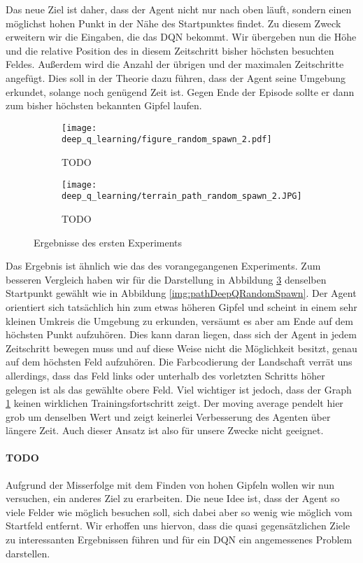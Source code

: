 Das neue Ziel ist daher, dass der Agent nicht nur nach oben läuft, sondern einen möglichst hohen Punkt in der Nähe des Startpunktes findet. Zu diesem Zweck erweitern wir die Eingaben, die das DQN bekommt. Wir übergeben nun die Höhe und die relative Position des in diesem Zeitschritt bisher höchsten besuchten Feldes. Außerdem wird die Anzahl der übrigen und der maximalen Zeitschritte angefügt. Dies soll in der Theorie dazu führen, dass der Agent seine Umgebung erkundet, solange noch genügend Zeit ist. Gegen Ende der Episode sollte er dann zum bisher höchsten bekannten Gipfel laufen.
\begin{figure}[H]
    \centering
    \begin{subfigure}[b]{0.49\textwidth}
        \texttt{[image: deep\_q\_learning/figure\_random\_spawn\_2.pdf]}
        \caption{TODO}
        \label{img:graphDeepQRandomSpawn2}
    \end{subfigure}
    \begin{subfigure}[b]{0.49\textwidth}
        \texttt{[image: deep\_q\_learning/terrain\_path\_random\_spawn\_2.JPG]}
        \caption{TODO}
        \label{img:pathDeepQRandomSpawn2}
    \end{subfigure}
    \caption{Ergebnisse des ersten Experiments}
\end{figure}
Das Ergebnis ist ähnlich wie das des vorangegangenen Experiments. Zum besseren Vergleich haben wir für die Darstellung in Abbildung \ref{img:pathDeepQRandomSpawn2} denselben Startpunkt gewählt wie in Abbildung \ref{img:pathDeepQRandomSpawn}. Der Agent orientiert sich tatsächlich hin zum etwas höheren Gipfel und scheint in einem sehr kleinen Umkreis die Umgebung zu erkunden, versäumt es aber am Ende auf dem höchsten Punkt aufzuhören. Dies kann  daran liegen, dass sich der Agent in jedem Zeitschritt bewegen muss und auf diese Weise nicht die Möglichkeit besitzt, genau auf dem höchsten Feld aufzuhören. Die Farbcodierung der Landschaft verrät uns allerdings, dass das Feld links oder unterhalb des vorletzten Schritts höher gelegen ist als das gewählte obere Feld. Viel wichtiger ist jedoch, dass der Graph \ref{img:graphDeepQRandomSpawn2} keinen wirklichen Trainingsfortschritt zeigt. Der moving average pendelt hier grob um denselben Wert und zeigt keinerlei Verbesserung des Agenten über längere Zeit. Auch dieser Ansatz ist also für unsere Zwecke nicht geeignet.

\paragraph{TODO}
Aufgrund der Misserfolge mit dem Finden von hohen Gipfeln wollen wir nun versuchen, ein anderes Ziel zu erarbeiten. Die neue Idee ist, dass der Agent so viele Felder wie möglich besuchen soll, sich dabei aber so wenig wie möglich vom Startfeld entfernt. Wir erhoffen uns hiervon, dass die quasi gegensätzlichen Ziele zu interessanten Ergebnissen führen und für ein DQN ein angemessenes Problem darstellen.

